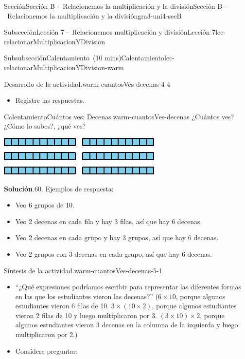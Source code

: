 \documentclass[oneside,10pt,]{article}
\newcommand{\blocktitlefont}{\relax}
\newlength{\fillinmaxwidth}
\newlength{\fillincontract}
\newlength{\charmaxwidth}\setlength{\charmaxwidth}{0.5em}
\newlength{\charminwidth}\setlength{\charminwidth}{0.1em}
\newlength{\fillinheight}
\newcommand{\fillintext}[1]{%
\setlength{\fillinmaxwidth}{#1\charmaxwidth}%
\setlength{\fillincontract}{#1\charminwidth}%
\setlength{\fillinheight}{\baselineskip}\addtolength{\fillinheight}{1.2pt}%
\strut\nobreak\leaders\vbox{\hrule width 0.3pt height 0.3pt \vskip -1.2pt}\hskip 1\fillinmaxwidth minus \fillincontract\nobreak\strut%
}
\begin{document}
\begin{sectionptx}{Sección}{Sección B -~Relacionemos la multiplicación y la división}{}{Sección B -~Relacionemos la multiplicación y la división}{}{}{gra3-uni4-secB}
\begin{subsectionptx}{Subsección}{Lección 7 -~Relacionemos multiplicación y división}{}{Lección 7}{}{}{lec-relacionarMultiplicacionYDivision}
\begin{subsubsectionptx}{Subsubsección}{Calentamiento~(10 mins)}{}{Calentamiento}{}{}{lec-relacionarMultiplicacionYDivision-warm}
\begin{paragraphs}{Desarrollo de la actividad.}{warm-cuantosVes-decenas-4-4}
\begin{itemize}[label=\textbullet]
\item{}Registre las respuestas.%
\end{itemize}
\end{paragraphs}%
\begin{exploration}{Calentamiento}{Cuántos ves: Decenas.}{warm-cuantosVes-decenas}%
¿Cuántos ves?\\
 ¿Cómo lo sabes?, ¿qué ves?%
\begin{image}{0}{1}{0}{}%
\includegraphics[width=\linewidth]{external/svg-source/tikz-file-147480-scale13.pdf}
\end{image}%
\par\smallskip%
\noindent\textbf{\blocktitlefont Solución}.\hypertarget{warm-cuantosVes-decenas-3}{}\quad{}60. Ejemplos de respuesta:%
%
\begin{itemize}[label=\textbullet]
\item{}Veo 6 grupos de 10.%
\item{}Veo 2 decenas en cada fila y hay 3 filas, así que hay 6 decenas.%
\item{}Veo 2 decenas en cada grupo y hay 3 grupos, así que hay 6 decenas.%
\item{}Veo 2 grupos con 3 decenas en cada grupo, así que hay 6 decenas.%
\end{itemize}
\end{exploration}%
\par
\begin{paragraphs}{Síntesis de la actividad.}{warm-cuantosVes-decenas-5-1}%
%
\begin{itemize}[label=\textbullet]
\item{}``¿Qué expresiones podríamos escribir para representar las diferentes formas en las que los estudiantes vieron las decenas?'' (\(6\times 10\), porque algunos estudiantes vieron 6 filas de 10. \(3 \times (10 \times 2)\), porque algunos estudiantes vieron 2 filas de 10 y luego multiplicaron por 3. \((3 \times 10) \times 2\), porque algunos estudiantes vieron 3 decenas en la columna de la izquierda y luego multiplicaron por 2.)%
\item{}Considere preguntar:%
%
\end{itemize}
\end{paragraphs}
\end{subsubsectionptx}
\end{subsectionptx}
\end{sectionptx}
\end{document}
